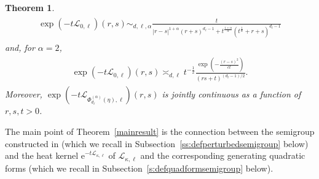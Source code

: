 \documentclass[12pt,reqno]{amsart}
\newtheorem{theorem}{Theorem}[section]
\theoremstyle{definition}
\theoremstyle{remark}
\numberwithin{equation}{section}
\newcommand{\1}{\mathbbm{1}}
\def\bs{\mathbb{S}}
\def\cl{\mathcal{L}}
\newcommand{\me}[1]{\mathrm{e}^{#1}}
\begin{document}
\begin{theorem}
\begin{align}
\begin{split}
       \exp\left(-t\cl_{0,\ell}\right)(r,s)
       \sim_{d,\ell,\alpha} \frac{t}{|r-s|^{1+\alpha}(r+s)^{d_\ell-1}+t^{\frac{1+\alpha}{\alpha}}(t^{\frac1\alpha}+r+s)^{d_\ell-1}} 
    \end{split}
  \end{align}
  and, for $\alpha=2$,
  \begin{align}
    \label{eq:mainresultfree2}
    \begin{split}
       \exp\left(-t\cl_{0,\ell}\right)(r,s)
       \asymp_{d,\ell} t^{-\frac12}\frac{\exp\left(-\frac{(r-s)^2}{ct}\right)}{(rs+t)^{(d_\ell-1)/2}}.
    \end{split}
  \end{align}
  Moreover, $\exp\left(-t\cl_{\Phi_{d_\ell}^{(\alpha)}(\eta),\ell}\right)(r,s)$ is jointly continuous as a function of $r,s,t>0$.
\end{theorem}

The main point of Theorem~\ref{mainresult} is the connection between the semigroup constructed in \cite{Bogdanetal2024} (which we recall in Subsection~\ref{ss:defperturbedsemigroup} below) and the heat kernel $\me{-t\cl_{\kappa,\ell}}$ of $\cl_{\kappa,\ell}$ and the corresponding generating quadratic forms (which we recall in Subsection~\ref{s:defquadformsemigroup} below).
\end{document}
